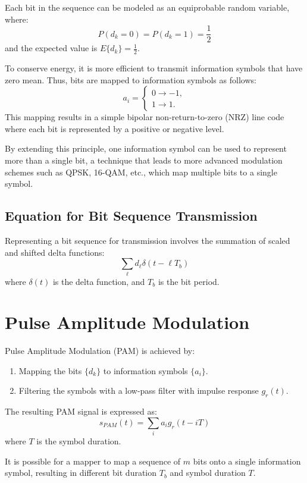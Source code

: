 Each bit in the sequence can be modeled as an equiprobable random variable, where:
\[
P(d_k = 0) = P(d_k = 1) = \frac{1}{2}
\]
and the expected value is \( E\{d_k\} = \frac{1}{2} \).

To conserve energy, it is more efficient to transmit information symbols that have zero mean. Thus, bits are mapped to information symbols as follows:
\[
a_i =
\begin{cases}
  0 \rightarrow -1,\\
  1 \rightarrow 1.
\end{cases}
\]
This mapping results in a simple bipolar non-return-to-zero (NRZ) line code where each bit is represented by a positive or negative level.

By extending this principle, one information symbol can be used to represent more than a single bit, a technique that leads to more advanced modulation schemes such as QPSK, 16-QAM, etc., which map multiple bits to a single symbol.

\subsection*{Equation for Bit Sequence Transmission}
Representing a bit sequence for transmission involves the summation of scaled and shifted delta functions:
\[
\sum_{\ell} d_{\ell}\delta(t - \ell T_b)
\]
where \( \delta(t) \) is the delta function, and \( T_b \) is the bit period.


\section*{Pulse Amplitude Modulation}

Pulse Amplitude Modulation (PAM) is achieved by:
\begin{enumerate}
    \item Mapping the bits \( \{d_k\} \) to information symbols \( \{a_i\} \).
    \item Filtering the symbols with a low-pass filter with impulse response \( g_r(t) \).
\end{enumerate}
The resulting PAM signal is expressed as:
\[ s_{PAM}(t) = \sum_i a_i g_r(t - iT) \]
where \( T \) is the symbol duration.

It is possible for a mapper to map a sequence of \( m \) bits onto a single information symbol, resulting in different bit duration \( T_b \) and symbol duration \( T \).

